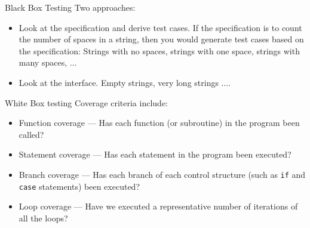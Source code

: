 \documentclass[handout]{beamer}
\begin{document}
\begin{frame}{Black Box Testing}
  Two approaches:
  \begin{itemize}
  \item Look at the specification and derive test cases. If the
    specification is to count the number of spaces in a string,
    then you would generate test cases based on the specification:
    Strings with no spaces, strings with one space, strings with many
    spaces, $\ldots$
  \item Look at the interface. Empty strings, very long strings
    $\ldots$.
      \end{itemize}
  \end{frame}
\begin{frame}{White Box testing}
Coverage criteria include:
  \begin{itemize}
  \item Function coverage --- Has each function (or subroutine) in the
    program been called?
  \item Statement coverage --- Has each statement in the program been
    executed?  
  \item Branch coverage --- Has each branch of each control structure
    (such as {\tt if} and {\tt case} statements) been executed?
  \item Loop coverage --- Have we executed a representative number of iterations
    of all the loops? 
  \end{itemize}
\end{frame}
\end{document}
